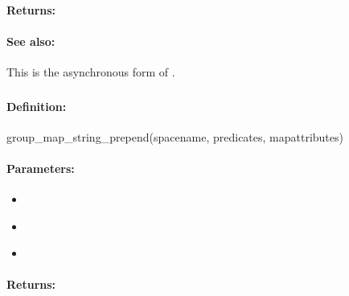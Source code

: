\paragraph{Returns:}


\paragraph{See also:}  This is the asynchronous form of .

\pagebreak
\subsubsection{}
\label{api:ruby:group_map_string_prepend}


\paragraph{Definition:}
\begin{rubycode}
group_map_string_prepend(spacename, predicates, mapattributes)
\end{rubycode}

\paragraph{Parameters:}
\begin{itemize}[noitemsep]
\item {}\\

\item {}\\

\item {}\\

\end{itemize}

\paragraph{Returns:}


